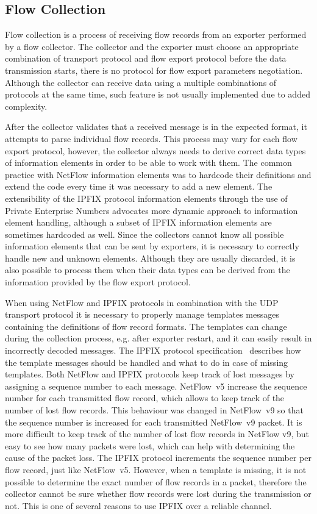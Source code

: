 \subsection{Flow Collection}\label{subsec:flow-collection}

Flow collection is a process of receiving flow records from an exporter performed by a flow collector. The collector and the exporter must choose an appropriate combination of transport protocol and flow export protocol before the data transmission starts, there is no protocol for flow export parameters negotiation. Although the collector can receive data using a multiple combinations of protocols at the same time, such feature is not usually implemented due to added complexity.

After the collector validates that a received message is in the expected format, it attempts to parse individual flow records. This process may vary for each flow export protocol, however, the collector always needs to derive correct data types of information elements in order to be able to work with them. The common practice with NetFlow information elements was to hardcode their definitions and extend the code every time it was necessary to add a new element. The extensibility of the IPFIX protocol information elements through the use of Private Enterprise Numbers advocates more dynamic approach to information element handling, although a subset of IPFIX information elements are sometimes hardcoded as well. Since the collectors cannot know all possible information elements that can be sent by exporters, it is necessary to correctly handle new and unknown elements. Although they are usually discarded, it is also possible to process them when their data types can be derived from the information provided by the flow export protocol.

When using NetFlow and IPFIX protocols in combination with the UDP transport protocol it is necessary to properly manage templates messages containing the definitions of flow record formats. The templates can change during the collection process, e.g. after exporter restart, and it can easily result in incorrectly decoded messages. The IPFIX protocol specification~\cite{rfc7011} describes how the template messages should be handled and what to do in case of missing templates. Both NetFlow and IPFIX protocols keep track of lost messages by assigning a sequence number to each message. NetFlow~v5 increase the sequence number for each transmitted flow record, which allows to keep track of the number of lost flow records. This behaviour was changed in NetFlow~v9 so that the sequence number is increased for each transmitted NetFlow~v9 packet. It is more difficult to keep track of the number of lost flow records in NetFlow v9, but easy to see how many packets were lost, which can help with determining the cause of the packet loss. The IPFIX protocol increments the sequence number per flow record, just like NetFlow~v5. However, when a template is missing, it is not possible to determine the exact number of flow records in a packet, therefore the collector cannot be sure whether flow records were lost during the transmission or not. This is one of several reasons to use IPFIX over a reliable channel.

